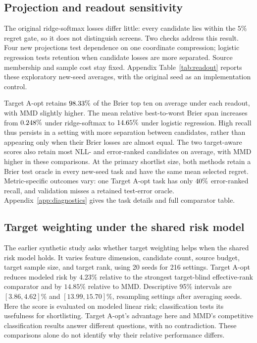 \subsection{Projection and readout sensitivity}
\label{sec:readout}
The original ridge-softmax losses differ little: every candidate lies within the $5\%$ regret gate, so it does not distinguish screens. Two checks address this result. Four new projections test dependence on one coordinate compression; logistic regression tests retention when candidate losses are more separated. Source membership and sample cost stay fixed. Appendix Table~\ref{tab:readout} reports these exploratory new-seed averages, with the original seed as an implementation control.

Target A-opt retains $98.33\%$ of the Brier top ten on average under each readout, with MMD slightly higher. The mean relative best-to-worst Brier span increases from $0.248\%$ under ridge-softmax to $14.65\%$ under logistic regression. High recall thus persists in a setting with more separation between candidates, rather than appearing only when their Brier losses are almost equal. The two target-aware scores also retain most NLL- and error-ranked candidates on average, with MMD higher in these comparisons.
At the primary shortlist size, both methods retain a Brier test oracle in every new-seed task and have the same mean selected regret. Metric-specific outcomes vary: one Target A-opt task has only $40\%$ error-ranked recall, and validation misses a retained test-error oracle. Appendix~\ref{app:diagnostics} gives the task details and full comparator table.

\subsection{Target weighting under the shared risk model}
The earlier synthetic study asks whether target weighting helps when the shared risk model holds. It varies feature dimension, candidate count, source budget, target sample size, and target rank, using 20 seeds for 216 settings. Target A-opt reduces modeled risk by $4.23\%$ relative to the strongest target-blind effective-rank comparator and by $14.85\%$ relative to MMD. Descriptive 95\% intervals are $[3.86,4.62]\%$ and $[13.99,15.70]\%$, resampling settings after averaging seeds. Here the score is evaluated on modeled linear risk; classification tests its usefulness for shortlisting. Target A-opt's advantage here and MMD's competitive classification results answer different questions, with no contradiction. These comparisons alone do not identify why their relative performance differs.

